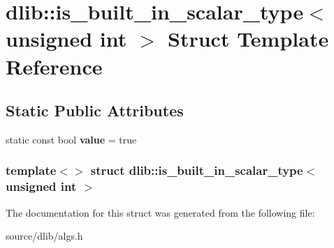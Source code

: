 \hypertarget{structdlib_1_1is__built__in__scalar__type_3_01unsigned_01int_01_4}{
\section{dlib::is\_\-built\_\-in\_\-scalar\_\-type$<$ unsigned int $>$ Struct Template Reference}
\label{structdlib_1_1is__built__in__scalar__type_3_01unsigned_01int_01_4}
}
\subsection*{Static Public Attributes}
\begin{DoxyCompactItemize}
\item 
\hypertarget{structdlib_1_1is__built__in__scalar__type_3_01unsigned_01int_01_4_a682e2695ed7279d5c532359a6c403c0b}{
static const bool {\bfseries value} = true}
\label{structdlib_1_1is__built__in__scalar__type_3_01unsigned_01int_01_4_a682e2695ed7279d5c532359a6c403c0b}

\end{DoxyCompactItemize}
\subsubsection*{template$<$$>$ struct dlib::is\_\-built\_\-in\_\-scalar\_\-type$<$ unsigned int $>$}



The documentation for this struct was generated from the following file:\begin{DoxyCompactItemize}
\item 
source/dlib/algs.h\end{DoxyCompactItemize}
